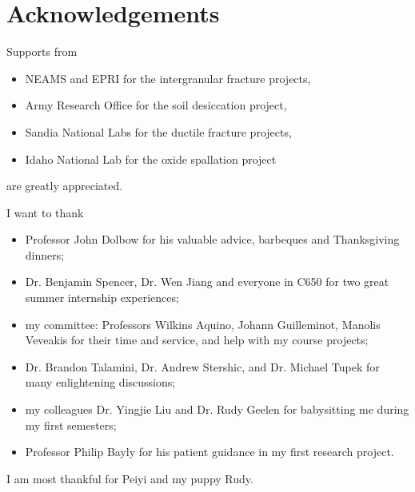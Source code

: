 \section{Acknowledgements}

\begin{frame}[noframenumbering]
  Supports from
  \begin{itemize}
    \item[] NEAMS and EPRI for the intergranular fracture projects,
    \item[] Army Research Office for the soil desiccation project,
    \item[] Sandia National Labs for the ductile fracture projects,
    \item[] Idaho National Lab for the oxide spallation project
  \end{itemize}
  are greatly appreciated.
  
  \bigskip
  
  I want to thank
  \begin{itemize}
    \item[] Professor John Dolbow for his valuable advice, barbeques and Thanksgiving dinners;
    \item[] Dr. Benjamin Spencer, Dr. Wen Jiang and everyone in C650 for two great summer internship experiences;
    \item[] my committee: Professors Wilkins Aquino, Johann Guilleminot, Manolis Veveakis for their time and service, and help with my course projects;
    \item[] Dr. Brandon Talamini, Dr. Andrew Stershic, and Dr. Michael Tupek for many enlightening discussions;
    \item[] my colleagues Dr. Yingjie Liu and Dr. Rudy Geelen for babysitting me during my first semesters;
    \item[] Professor Philip Bayly for his patient guidance in my first research project.
  \end{itemize}
  
  \bigskip
  
  I am most thankful for Peiyi and my puppy Rudy.
\end{frame}
